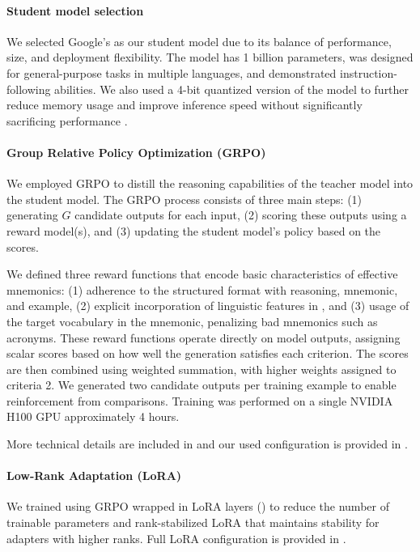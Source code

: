 \paragraph{Student model selection} We selected Google's \studentmodel \citep{GemmaTeamGEMMA2025} as our student model due to its balance of performance, size, and deployment flexibility. The model has 1 billion parameters, was designed for general-purpose tasks in multiple languages, and demonstrated instruction-following abilities. We also used a 4-bit quantized version of the model to further reduce memory usage and improve inference speed without significantly sacrificing performance \citep{dettmersQLoRAEfficientFinetuning2023}.

\paragraph{Group Relative Policy Optimization (GRPO)} We employed GRPO \citep{DeepSeek-AIDEEPSEEKR12025} to distill the reasoning capabilities of the teacher model into the student model. The GRPO process consists of three main steps: (1) generating $G$ candidate outputs for each input, (2) scoring these outputs using a reward model(s), and (3) updating the student model's policy based on the scores.

We defined three reward functions that encode basic characteristics of effective mnemonics:
(1) adherence to the structured format with reasoning, mnemonic, and example,
(2) explicit incorporation of linguistic features in , and
(3) usage of the target vocabulary in the mnemonic, penalizing bad mnemonics such as acronyms.
These reward functions operate directly on model outputs, assigning scalar scores based on how well the generation satisfies each criterion. The scores are then combined using weighted summation, with higher weights assigned to criteria 2. We generated two candidate outputs per training example to enable reinforcement from comparisons. Training was performed on a single NVIDIA H100 GPU approximately 4 hours.

More technical details are included in   and our used configuration is provided in .

\paragraph{Low-Rank Adaptation (LoRA)} We trained \studentmodel using GRPO wrapped in LoRA layers () to reduce the number of trainable parameters and rank-stabilized LoRA that maintains stability for adapters with higher ranks. Full LoRA configuration is provided in .
